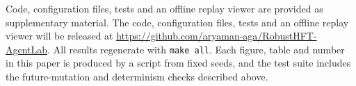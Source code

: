 \ifanonymous
Code, configuration files, tests and an offline replay viewer are provided as supplementary material.
\else
The code, configuration files, tests and an offline replay viewer will be released at \url{https://github.com/aryaman-aga/RobustHFT-AgentLab}.
\fi
All results regenerate with \texttt{make all}. Each figure, table and number in this paper is produced by a script from fixed seeds, and the test suite includes the future-mutation and determinism checks described above.
